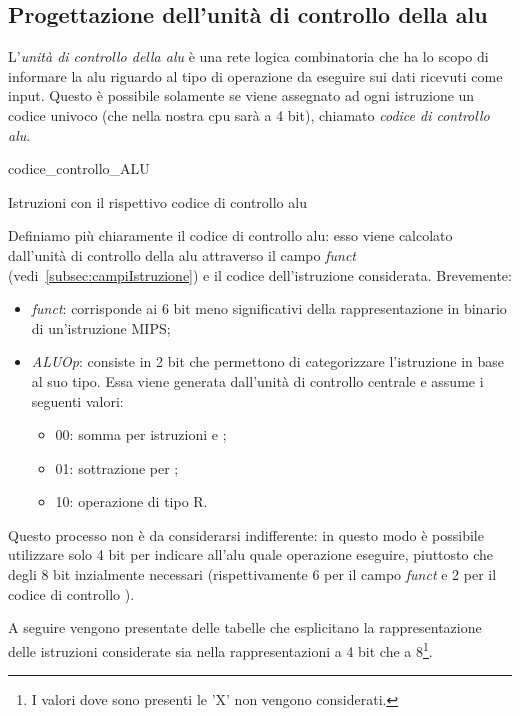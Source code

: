 \documentclass[class=book, crop=false, oneside]{standalone}
\begin{document}
\subsection{Progettazione dell'unità di controllo della \acrshort{alu}}
L'\emph{unità di controllo della \acrshort{alu}} è una rete logica combinatoria che ha lo scopo di informare la \acrshort{alu} riguardo al tipo di operazione da eseguire sui dati ricevuti come input. Questo è possibile solamente se viene assegnato ad ogni istruzione un codice univoco (che nella nostra \acrshort{cpu} sarà a 4 bit), chiamato \emph{codice di controllo \acrshort{alu}}.

\begin{table}[H]
	\centering
	{codice_controllo_ALU}
	\caption{Istruzioni con il rispettivo codice di controllo \acrshort{alu}}
\end{table}
Definiamo più chiaramente il codice di controllo \acrshort{alu}: esso viene calcolato dall'unità di controllo della \acrshort{alu} attraverso il campo \emph{funct} (vedi~\ref{subsec:campiIstruzione}) e il codice  dell'istruzione considerata. Brevemente:
\begin{itemize}
	\item \emph{funct}: corrisponde ai 6 bit meno significativi della rappresentazione in binario di un'istruzione MIPS;
	\item \emph{ALUOp}: consiste in 2 bit che permettono di categorizzare l'istruzione in base al suo tipo. Essa viene generata dall'unità di controllo centrale e assume i seguenti valori:
	\begin{itemize}
		\item 00: somma per istruzioni  e ;
		\item 01: sottrazione per ;
		\item 10: operazione di tipo R.
	\end{itemize}
\end{itemize}
Questo processo non è da considerarsi indifferente: in questo modo è possibile utilizzare solo 4 bit per indicare all'\acrshort{alu} quale operazione eseguire, piuttosto che degli 8 bit inzialmente necessari (rispettivamente 6 per il campo \emph{funct} e 2 per il codice di controllo ).

A seguire vengono presentate delle tabelle che esplicitano la rappresentazione delle istruzioni considerate sia nella rappresentazioni a 4 bit che a 8\footnote{I valori dove sono presenti le 'X' non vengono considerati.}.
\end{document}
